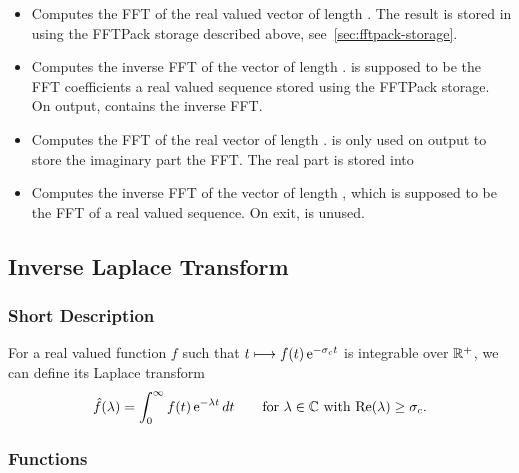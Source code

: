 \begin{itemize}
\item {}
  \sshortdescribe Computes the FFT of the real valued vector  of
  length . The result is stored in  using the FFTPack storage
  described above, see~\ref{sec:fftpack-storage}.

\item {}
  \sshortdescribe Computes the inverse FFT of the vector  of length
  .  is supposed to be the FFT coefficients a real valued
  sequence stored using the FFTPack storage. On output,  contains
  the inverse FFT.

\item {}
  \sshortdescribe Computes the FFT of the real vector  of length .
   is only used on output to store the imaginary part the FFT. The
  real part is stored into 
  
\item {}
  \sshortdescribe Computes the inverse FFT of the vector  of
  length , which is supposed to be the FFT of a real valued
  sequence. On exit,  is unused. 
\end{itemize}

\subsection{Inverse Laplace Transform}
\subsubsection{Short Description}

For a real valued function $f$ such that $t \longmapsto f(t) \operatorname{e}^{ - \sigma_c
  t }$ is integrable over ${\mathbb R}^+$, we can define its Laplace transform
\begin{equation*}
  \hat{f}(\lambda) = \int_0^\infty f(t) \operatorname{e}^{ - \lambda t } dt \qquad
  \mbox{for $\lambda \in {\mathbb C}$ with $\operatorname{Re}(\lambda) \ge \sigma_c$}.
\end{equation*}

\subsubsection{Functions}

